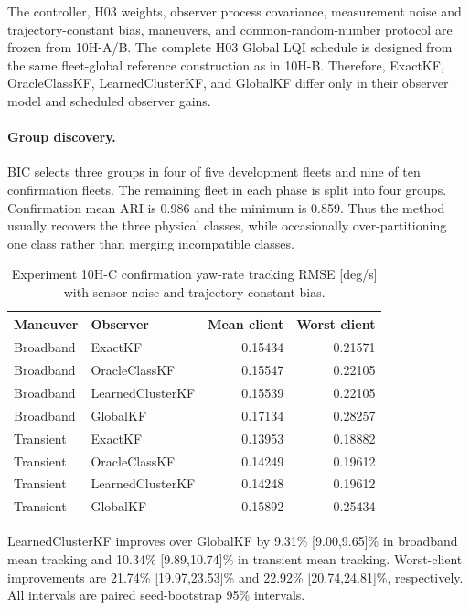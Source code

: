 The controller, H03 weights, observer process covariance, measurement noise
and trajectory-constant bias, maneuvers, and common-random-number protocol are
frozen from 10H-A/B. The complete H03 Global LQI schedule is designed from the
same fleet-global reference construction as in 10H-B. Therefore, ExactKF,
OracleClassKF, LearnedClusterKF, and GlobalKF differ only in their observer
model and scheduled observer gains.

\paragraph{Group discovery.}
BIC selects three groups in four of five development fleets and nine of ten
confirmation fleets. The remaining fleet in each phase is split into four
groups. Confirmation mean ARI is 0.986 and the minimum is 0.859. Thus the
method usually recovers the three physical classes, while occasionally
over-partitioning one class rather than merging incompatible classes.

\begin{table}[htbp]
\centering
\caption{Experiment 10H-C confirmation yaw-rate tracking RMSE [deg/s] with
sensor noise and trajectory-constant bias.}
\label{tab:experiment10hc-performance}
\begin{tabular}{llrr}
\toprule
Maneuver & Observer & Mean client & Worst client\\
\midrule
Broadband & ExactKF          & 0.15434 & 0.21571\\
Broadband & OracleClassKF    & 0.15547 & 0.22105\\
Broadband & LearnedClusterKF & 0.15539 & 0.22105\\
Broadband & GlobalKF         & 0.17134 & 0.28257\\
\midrule
Transient & ExactKF          & 0.13953 & 0.18882\\
Transient & OracleClassKF    & 0.14249 & 0.19612\\
Transient & LearnedClusterKF & 0.14248 & 0.19612\\
Transient & GlobalKF         & 0.15892 & 0.25434\\
\bottomrule
\end{tabular}
\end{table}

LearnedClusterKF improves over GlobalKF by 9.31\%
[9.00,9.65]\% in broadband mean tracking and 10.34\%
[9.89,10.74]\% in transient mean tracking. Worst-client improvements are
21.74\% [19.97,23.53]\% and 22.92\% [20.74,24.81]\%, respectively. All
intervals are paired seed-bootstrap 95\% intervals.

